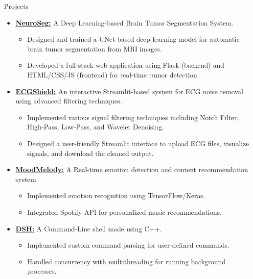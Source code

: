 \documentclass{resume} %
\begin{document}
\begin{rSection}{Projects}
\begin{itemize}\setlength{\itemsep}{-2pt}
    \item{\href{https://github.com/mystichronicle/NeuroSeg}{{\bf NeuroSeg:}} 
    A Deep Learning-based Brain Tumor Segmentation System.\vspace{-2pt} 
    \begin{itemize}\setlength{\itemsep}{-2pt}
        \item Designed and trained a UNet-based deep learning model for automatic brain tumor segmentation from MRI images.
        \item Developed a full-stack web application using Flask (backend) and HTML/CSS/JS (frontend) for real-time tumor detection.
    \end{itemize}}
    
    \item{\href{https://github.com/mystichronicle/ECGShield}{{\bf ECGShield:}} 
    An interactive Streamlit-based system for ECG noise removal using advanced filtering techniques.\vspace{-2pt} 
    \begin{itemize}\setlength{\itemsep}{-2pt}
        \item Implemented various signal filtering techniques including Notch Filter, High-Pass, Low-Pass, and Wavelet Denoising.
        \item Designed a user-friendly Streamlit interface to upload ECG files, visualize signals, and download the cleaned output.
    \end{itemize}}

    \item{\href{https://github.com/mystichronicle/MoodMelody}{{\bf MoodMelody:}} 
    A Real-time emotion detection and content recommendation system.\vspace{-2pt} 
    \begin{itemize}\setlength{\itemsep}{-2pt}
        \item Implemented emotion recognition using TensorFlow/Keras.
        \item Integrated Spotify API for personalized music recommendations.
    \end{itemize}}
    
       \item {\href{https://github.com/mystichronicle/dsh}{{\bf DSH:}}
    A Command-Line shell made using C++.\vspace{-2pt} 
    \begin{itemize}\setlength{\itemsep}{-2pt}
        \item Implemented custom command parsing for user-defined commands.
        \item Handled concurrency with multithreading for running background processes.
    \end{itemize}}
    

\end{itemize}
\end{rSection}
\end{document}
